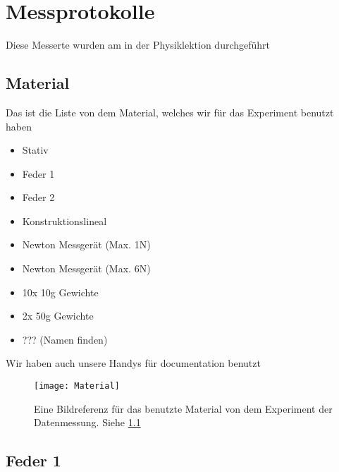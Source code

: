 \documentclass[../main.tex]{subfiles} %
\begin{document}
\chapter{Messprotokolle}\label{ch:messprotokolle}

Diese Messerte wurden am  in der Physiklektion durchgeführt

\section{Material}\label{sec:material}

Das ist die Liste von dem Material, welches wir für das Experiment benutzt haben

\begin{itemize}
    \item Stativ
    \item Feder 1
    \item Feder 2
    \item Konstruktionslineal
    \item Newton Messgerät (Max. 1N)
    \item Newton Messgerät (Max. 6N)
    \item 10x 10g Gewichte
    \item 2x 50g Gewichte
    \item ??? (Namen finden)
\end{itemize}
\noindent
Wir haben auch unsere Handys für documentation benutzt

\begin{figure}[ht]
    \centering
    \texttt{[image: Material]}
    \caption{Eine Bildreferenz für das benutzte Material von dem Experiment der Datenmessung. Siehe \ref{sec:material}}
    \label{fig:material}
\end{figure}

\section{Feder 1}\label{sec:feder-1}
\end{document}
